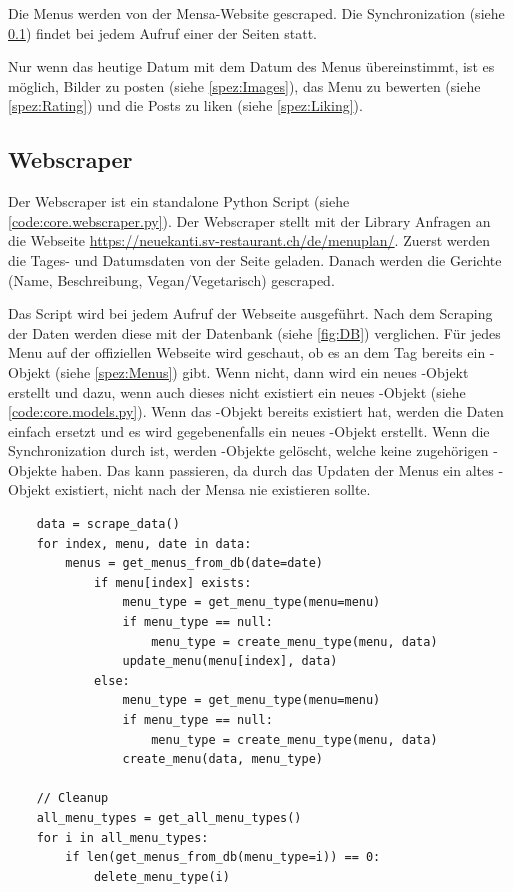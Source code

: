 Die Menus werden von der Mensa-Website gescraped. Die Synchronization (siehe
\ref{spez:Webscraper}) findet bei jedem Aufruf einer der Seiten statt.

Nur wenn das heutige Datum mit dem Datum des Menus übereinstimmt, ist es
möglich, Bilder zu posten (siehe \ref{spez:Images}), das Menu zu bewerten (siehe
\ref{spez:Rating}) und die Posts zu liken (siehe \ref{spez:Liking}).

\subsection{Webscraper} \label{spez:Webscraper}

Der Webscraper ist ein standalone Python Script (siehe
\ref{code:core.webscraper.py}). Der Webscraper stellt mit der Library
 Anfragen an die Webseite
\url{https://neuekanti.sv-restaurant.ch/de/menuplan/}. Zuerst werden die Tages-
und Datumsdaten von der Seite geladen. Danach werden die Gerichte (Name,
Beschreibung, Vegan/Vegetarisch) gescraped.

Das Script wird bei jedem Aufruf der Webseite ausgeführt. Nach dem Scraping der
Daten werden diese mit der Datenbank (siehe \ref{fig:DB}) verglichen. Für jedes
Menu auf der offiziellen Webseite wird geschaut, ob es an dem Tag bereits ein
-Objekt (siehe \ref{spez:Menus}) gibt. Wenn nicht, dann wird ein
neues -Objekt erstellt und dazu, wenn auch dieses nicht existiert ein
neues -Objekt (siehe \ref{code:core.models.py}). Wenn das
-Objekt bereits existiert hat, werden die Daten einfach ersetzt und
es wird gegebenenfalls ein neues -Objekt erstellt. Wenn die
Synchronization durch ist, werden -Objekte gelöscht, welche keine
zugehörigen -Objekte haben. Das kann passieren, da durch das Updaten
der Menus ein altes -Objekt existiert, nicht nach der Mensa nie
existieren sollte.

\newpage

\begin{lstlisting}
    data = scrape_data()
    for index, menu, date in data:
        menus = get_menus_from_db(date=date)
            if menu[index] exists:
                menu_type = get_menu_type(menu=menu)
                if menu_type == null:
                    menu_type = create_menu_type(menu, data)
                update_menu(menu[index], data)
            else:
                menu_type = get_menu_type(menu=menu)
                if menu_type == null:
                    menu_type = create_menu_type(menu, data)
                create_menu(data, menu_type)
    
    // Cleanup
    all_menu_types = get_all_menu_types()
    for i in all_menu_types:
        if len(get_menus_from_db(menu_type=i)) == 0:
            delete_menu_type(i)
\end{lstlisting}

